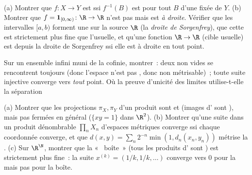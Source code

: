 \begin{exercise}[$\star$]\label{exo:b3:topology:2}
(a) Montrer que $f\colon X \to Y$ est  ssi $f^{-1}(B)$
est  pour tout $B$ d'une  fixée de $Y$.
(b) Montrer que $f = \mathbf 1_{[0,\infty)} \colon \R \to \R$
n'est pas  mais est \emph{ à droite}. Vérifier
que les intervalles  $[a, b)$ forment une  sur la source $\R$ (la \emph{droite de
Sorgenfrey}), que cette  est strictement plus fine que
l'usuelle, et qu'une fonction $\R \to \R$ (cible usuelle) est
 depuis la droite de Sorgenfrey ssi elle est  à
droite en tout point.
\end{exercise}

\begin{exercise}[$\star$]\label{exo:b3:topology:3}
Sur un ensemble infini muni de la  cofinie, montrer~:
deux  non vides se rencontrent toujours (donc l'espace
n'est pas , donc non métrisable)~; toute suite injective
converge vers \emph{tout} point. Où la preuve d'unicité des
limites utilise-t-elle la séparation~
\end{exercise}

\begin{exercise}[$\star\star$]\label{exo:b3:topology:4}
(a) Montrer que les projections $\pi_X, \pi_Y$ d'un produit sont
 et \emph{} (images d' sont ),
mais pas fermées en général ($\{xy = 1\}$ dans $\R^2$).
(b) Montrer qu'une suite dans un produit dénombrable $\prod_n
X_n$ d'espaces métriques converge ssi chaque coordonnée
converge, et que $d(x, y) = \sum_n 2^{-n}\min(1, d_n(x_n,
y_n))$ métrise la .
(c) Sur $\R^\N$, montrer que la «~ boîte~» (tous les
produits d' sont ) est strictement plus fine~: la
suite $x^{(k)} = (1/k, 1/k, \dots)$ converge vers $0$ pour la
 mais pas pour la  boîte.
\end{exercise}

